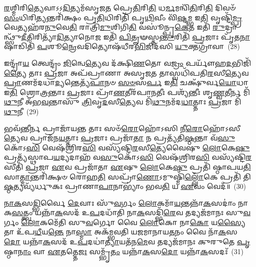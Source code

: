 \-\ul{𑌰}\-𑌶𑍍𑌮𑌿𑌰𑌿\-\ul{𑌤𑍍𑌯𑍇}\-𑌵𑌾𑌽𑌽\-\ul{𑌦𑌿}\-𑌤𑍍𑌯𑌮᳴𑌸𑍃𑌜\-\ul{𑌤} 𑌪𑍍𑌰𑍇\-\ul{𑌤𑌿}\-𑌰𑌿\-\ul{𑌤𑌿} 𑌧\-\ul{𑌰𑍍𑌮}\-𑌮𑌨𑍍𑌵𑌿᳴\-\ul{𑌤𑌿}\-𑌰𑌿\-\ul{𑌤𑌿} 𑌦𑌿𑌵𑍞᳴ \ul{𑌸𑌂}\-𑌧𑌿𑌰𑌿\-\ul{𑌤𑍍𑌯}\-𑌨𑍍𑌤𑌰𑌿᳴𑌕𑍍𑌷𑌂 𑌪𑍍𑌰\-\ul{𑌤𑌿}\-𑌧𑌿𑌰𑌿𑌤𑌿᳴ 𑌪𑍃\-\ul{𑌥𑌿}\-𑌵𑍀𑌂 𑌵𑌿᳴\-\ul{𑌷𑍍𑌟}\-𑌮𑍍𑌭 𑌇\-\ul{𑌤𑌿} 𑌵𑍃𑌷𑍍𑌟𑌿᳴\-\ul{𑌮𑍍𑌪𑍍𑌰}\-𑌵𑍇𑌤𑍍𑌯𑌹᳴𑌰\-\ul{𑌨𑍁}\-𑌵𑍇\-\ul{𑌤𑌿} 𑌰𑌾𑌤𑍍𑌰𑌿᳴\-\ul{𑌮𑍁}\-𑌶𑌿𑌗𑌿\-\ul{𑌤𑌿} 𑌵𑌸𑍂॑𑌨𑍍𑌪𑍍𑌰\-\ul{𑌕𑍇}\-𑌤 𑌇𑌤𑌿᳴ \ul{𑌰𑍁}\-𑌦𑍍𑌰𑌾𑌨𑍍𑌥𑍍𑌸𑍁᳴\-\ul{𑌦𑍀}\-𑌤𑌿𑌰𑌿𑌤𑍍𑌯𑌾᳴\-\ul{𑌦𑌿}\-𑌤𑍍𑌯𑌾𑌨𑍋\-\ul{𑌜} 𑌇𑌤𑌿᳴ \ul{𑌪𑌿}\-𑌤𑍄𑍟𑌸𑍍𑌤\-\ul{𑌨𑍍𑌤𑍁}\-𑌰𑌿𑌤𑌿᳴ \ul{𑌪𑍍𑌰}\-𑌜𑌾𑌃 𑌪𑍃᳴𑌤\-\ul{𑌨𑌾}\-𑌷𑌾𑌡𑌿𑌤𑌿᳴ \ul{𑌪}\-𑌶𑍂\-\ul{𑌨𑍍𑌰𑍇}\-𑌵𑌦𑌿𑌤𑍍𑌯𑍋𑌷᳴𑌧𑍀𑌰\-\ul{𑌭𑌿}\-𑌜𑌿𑌦᳴𑌸𑌿 \ul{𑌯𑍁}\-𑌕𑍍𑌤𑌗𑍍𑌰𑌾᳴𑌵𑌾~(28)

𑌇𑌨𑍍𑌦𑍍𑌰𑌾᳴\-\ul{𑌯} 𑌤𑍍𑌵𑍇𑌨𑍍𑌦𑍍𑌰𑌂᳴ \ul{𑌜𑌿}\-𑌨𑍍𑌵𑍇\-\ul{𑌤𑍍𑌯𑍇}\-𑌵 𑌦᳴𑌕𑍍𑌷𑌿\-\ul{𑌣}\-𑌤𑍋 𑌵\-\ul{𑌜𑍍𑌰𑌂} 𑌪𑌰𑍍𑌯𑍗᳴𑌹\-\ul{𑌦}\-𑌭𑌿𑌜𑌿᳴\-\ul{𑌤𑍍𑌯𑍈} 𑌤𑌾𑌃 \ul{𑌪𑍍𑌰}\-𑌜𑌾 𑌅𑌪᳴𑌪𑍍𑌰𑌾𑌣𑌾 𑌅𑌸𑍃𑌜\-\ul{𑌤} 𑌤𑌾𑌸𑍍𑌵𑌧𑌿᳴𑌪𑌤𑌿\-\ul{𑌰}\-𑌸𑍀\-\ul{𑌤𑍍𑌯𑍇}\-𑌵 \ul{𑌪𑍍𑌰𑌾}\-𑌣𑌮᳴𑌦𑌧𑌾\-\ul{𑌦𑍍𑌯}\-𑌨𑍍𑌤𑍇𑌤𑍍𑌯᳴\-\ul{𑌪𑌾}\-𑌨𑍞 \ul{𑌸}\-\-\ul{𑍞}\-𑌸\-\ul{𑌰𑍍𑌪} 𑌇\-\ul{𑌤𑌿} 𑌚𑌕𑍍𑌷𑍁᳴𑌰𑍍𑌵\-\ul{𑌯𑍋}\-𑌧𑌾 𑌇\-\ul{𑌤𑌿} 𑌶𑍍𑌰𑍋\-\ul{𑌤𑍍𑌰}\-𑌨𑍍𑌤𑌾𑌃 \ul{𑌪𑍍𑌰}\-𑌜𑌾𑌃 𑌪𑍍𑌰𑌾᳴\-\ul{𑌣}\-𑌤𑍀𑌰᳴𑌪𑌾\-\ul{𑌨}\-𑌤𑍀𑌃 𑌪𑌶𑍍𑌯᳴𑌨𑍍𑌤𑍀𑌃 𑌶𑍃\-\ul{𑌣𑍍𑌵}\-𑌤𑍀𑌰𑍍𑌨 𑌮𑌿᳴\-\ul{𑌥𑍁}\-𑌨𑍀 𑌅᳴𑌭\-\ul{𑌵}\-𑌨𑍍𑌤𑌾𑌸𑍁᳴ \ul{𑌤𑍍𑌰𑌿}\-𑌵𑍃\-\ul{𑌦}\-𑌸𑍀\-\ul{𑌤𑍍𑌯𑍇}\-𑌵 𑌮𑌿᳴\-\ul{𑌥𑍁}\-𑌨𑌮᳴𑌦\-\ul{𑌧𑌾}\-𑌤𑍍𑌤𑌾𑌃 \ul{𑌪𑍍𑌰}\-𑌜𑌾 𑌮𑌿᳴\-\ul{𑌥𑍁}\-𑌨𑍀~(29)

𑌭𑌵᳴\-\ul{𑌨𑍍𑌤𑍀}\-𑌰𑍍𑌨 𑌪𑍍𑌰𑌾𑌜𑌾᳴𑌯\-\ul{𑌨𑍍𑌤} 𑌤𑌾𑌃 𑌸𑍞᳴\-\ul{𑌰𑍋}\-𑌹𑍋᳴\-𑌽𑌸𑌿 𑌨𑍀\-\ul{𑌰𑍋}\-𑌹𑍋᳴\-𑌽𑌸𑍀\-\ul{𑌤𑍍𑌯𑍇}\-𑌵 𑌪𑍍𑌰𑌾𑌜᳴𑌨\-\ul{𑌯}\-𑌤𑍍𑌤𑌾𑌃 \ul{𑌪𑍍𑌰}\-𑌜𑌾𑌃 𑌪𑍍𑌰𑌜𑌾᳴\-\ul{𑌤𑌾} 𑌨 𑌪𑍍𑌰𑌤𑍍𑌯᳴𑌤𑌿\-\ul{𑌷𑍍𑌠}\-𑌨𑍍𑌤𑌾 𑌵᳴\-\ul{𑌸𑍁}\-𑌕𑍋᳴\-𑌽\-\ul{𑌸𑌿} 𑌵𑍇𑌷᳴𑌶𑍍𑌰𑌿𑌰\-\ul{𑌸𑌿} 𑌵𑌸𑍍𑌯᳴𑌷𑍍𑌟𑌿\-\ul{𑌰}\-𑌸𑍀\-\ul{𑌤𑍍𑌯𑍇}\-𑌵𑍈𑌷𑍁 \ul{𑌲𑍋}\-𑌕𑍇\-\ul{𑌷𑍁} 𑌪𑍍𑌰𑌤𑍍𑌯᳴𑌸𑍍𑌥𑌾𑌪\-\ul{𑌯}\-𑌦𑍍𑌯𑌦𑌾𑌹᳴ 𑌵\-\ul{𑌸𑍁}\-𑌕𑍋᳴\-𑌽\-\ul{𑌸𑌿} 𑌵𑍇𑌷᳴𑌶𑍍𑌰𑌿𑌰\-\ul{𑌸𑌿} 𑌵𑌸𑍍𑌯᳴𑌷𑍍𑌟𑌿\-\ul{𑌰}\-𑌸𑍀𑌤𑌿᳴ \ul{𑌪𑍍𑌰}\-𑌜𑌾 \ul{𑌏}\-𑌵 𑌪𑍍𑌰𑌜𑌾᳴𑌤𑌾 \ul{𑌏}\-𑌷𑍁 \ul{𑌲𑍋}\-𑌕𑍇\-\ul{𑌷𑍁} 𑌪𑍍𑌰𑌤𑌿᳴ 𑌷𑍍𑌠𑌾𑌪𑌯\-\ul{𑌤𑌿} 𑌸𑌾\-\ul{𑌤𑍍𑌮𑌾}\-𑌨𑍍𑌤𑌰𑌿᳴𑌕𑍍𑌷𑍞 𑌰𑍋𑌹\-\ul{𑌤𑌿} 𑌸𑌪𑍍𑌰𑌾᳴\-\ul{𑌣𑍋}\-\-𑌽𑌮𑍁𑌷𑍍𑌮𑌿᳴\-\ul{𑌲𑍍𑌲𑍋𑌁}\-𑌕𑍇 𑌪𑍍𑌰𑌤𑌿᳴ 𑌤𑌿\-\ul{𑌷𑍍𑌠}\-𑌤𑍍𑌯𑌵𑍍𑌯᳴𑌰𑍍𑌧𑍁𑌕𑌃 𑌪𑍍𑌰𑌾𑌣𑌾\-\ul{𑌪𑌾}\-𑌨𑌾\-𑌭𑍍𑌯𑌾𑌂॑ 𑌭𑌵\-\ul{𑌤𑌿} 𑌯 \ul{𑌏}\-𑌵𑌂 𑌵𑍇𑌦᳴॥~(30)

{\anuvakamend[{\-\ul{𑌯𑍁}\-𑌕𑍍𑌤𑌗𑍍𑌰𑌾᳴𑌵𑌾 \ul{𑌪𑍍𑌰}\-𑌜𑌾 𑌮𑌿᳴\-\ul{𑌥𑍁}\-𑌨𑍍𑌯᳴𑌨𑍍𑌤𑌰𑌿᳴\-\ul{𑌕𑍍𑌷𑌂} 𑌦𑍍𑌵𑌾𑌦᳴𑌶 𑌚}]}%

\-\ul{𑌨𑌾}\-\-\ul{𑌕}\-𑌸\-\ul{𑌦𑍍𑌭𑌿}\-𑌰𑍍𑌵𑍈 \ul{𑌦𑍇}\-𑌵𑌾𑌃 𑌸𑍁᳴\-\ul{𑌵}\-𑌰𑍍𑌗𑌂 \ul{𑌲𑍋}\-𑌕𑌮𑌾᳴\-\ul{𑌯}\-𑌨𑍍𑌤𑌨𑍍𑌨𑌾᳴\-\ul{𑌕}\-𑌸𑌦𑌾𑌂॑ 𑌨𑌾𑌕\-\ul{𑌸}\-𑌤𑍍𑌤𑍍𑌵𑌂 𑌯𑌨𑍍𑌨𑌾᳴\-\ul{𑌕}\-𑌸𑌦᳴ 𑌉\-\ul{𑌪}\-𑌦𑌧𑌾᳴𑌤𑌿 𑌨𑌾\-\ul{𑌕}\-𑌸𑌦𑍍𑌭𑌿᳴\-\ul{𑌰𑍇}\-𑌵 𑌤𑌦𑍍𑌯𑌜᳴𑌮𑌾𑌨𑌃 𑌸𑍁\-\ul{𑌵}\-𑌰𑍍𑌗𑌂 \ul{𑌲𑍋}\-𑌕𑌮𑍇᳴𑌤𑌿 𑌸𑍁\-\ul{𑌵}\-𑌰𑍍𑌗𑍋 𑌵𑍈 \ul{𑌲𑍋}\-𑌕𑍋 𑌨𑌾\-\ul{𑌕𑍋} 𑌯\-\ul{𑌸𑍍𑌯𑍈}\-𑌤𑌾 𑌉᳴𑌪\-\ul{𑌧𑍀}\-𑌯\-\ul{𑌨𑍍𑌤𑍇} 𑌨𑌾\-\ul{𑌸𑍍𑌮𑌾} 𑌅𑌕᳴𑌮𑍍𑌭𑌵𑌤𑌿 𑌯𑌜𑌮𑌾𑌨𑌾𑌯\-\ul{𑌤}\-𑌨𑌂 𑌵𑍈 𑌨𑌾᳴\-\ul{𑌕}\-𑌸\-\ul{𑌦𑍋} 𑌯𑌨𑍍𑌨𑌾᳴\-\ul{𑌕}\-𑌸𑌦᳴ 𑌉\-\ul{𑌪}\-𑌦𑌧𑌾॑\-\ul{𑌤𑍍𑌯𑌾}\-𑌯𑌤᳴𑌨\-\ul{𑌮𑍇}\-𑌵 𑌤𑌦𑍍𑌯𑌜᳴𑌮𑌾𑌨𑌃 𑌕𑍁𑌰𑍁𑌤𑍇 \ul{𑌪𑍃}\-𑌷𑍍𑌠𑌾\-\ul{𑌨𑌾𑌂} 𑌵𑌾 \ul{𑌏}\-𑌤𑌤𑍍𑌤𑍇\-\ul{𑌜𑌃} 𑌸𑌮𑍍𑌭𑍃᳴\-\ul{𑌤𑌂} 𑌯𑌨𑍍𑌨𑌾᳴\-\ul{𑌕}\-𑌸\-\ul{𑌦𑍋} 𑌯𑌨𑍍𑌨𑌾᳴\-\ul{𑌕}\-𑌸𑌦𑌃᳴~(31)


